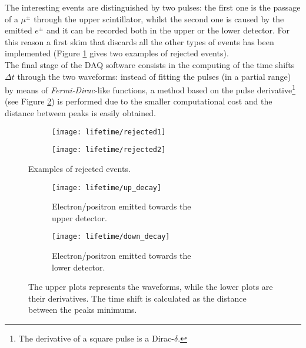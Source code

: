 The interesting events are distinguished by two pulses: the first one is the passage of a $\mu^\pm$ through the upper scintillator, whilst the second one is caused by the emitted $e^\pm$ and it can be recorded both in the upper or the lower detector. For this reason a first skim that discards all the other types of events has been implemented (Figure \ref{fig:rej} gives two examples of rejected events).\\

The final stage of the DAQ software consists in the computing of the time shifts $\Delta t$ through the two waveforms: instead of fitting the pulses (in a partial range) by means of \emph{Fermi-Dirac}-like functions, a method based on the pulse derivative\footnote{The derivative of a square pulse is a Dirac-$\delta$.} (see Figure \ref{fig:derivative}) is performed due to the smaller computational cost and the distance between peaks is easily obtained.

\begin{figure}[!htp]
	\centering
	\begin{subfigure}{.5\linewidth}
		\centering
		\texttt{[image: lifetime/rejected1]}
	\end{subfigure}\hfill
	\begin{subfigure}{.5\linewidth}
		\centering
		\texttt{[image: lifetime/rejected2]}
	\end{subfigure}
	\caption{Examples of rejected events.}
	\label{fig:rej}
\end{figure}

\begin{figure}[!htp]
	\centering
	\begin{subfigure}{.5\linewidth}
		\centering
		\texttt{[image: lifetime/up\_decay]}
		\caption{Electron/positron emitted towards the\\ upper detector.}
	\end{subfigure}\hfill
	\begin{subfigure}{.5\linewidth}
		\centering
		\texttt{[image: lifetime/down\_decay]}
		\caption{Electron/positron emitted towards the\\ lower detector.}
	\end{subfigure}
	\caption{The upper plots represents the waveforms, while the lower plots are their derivatives. The time shift is calculated as the distance between the peaks minimums.} \label{fig:derivative}
\end{figure}

